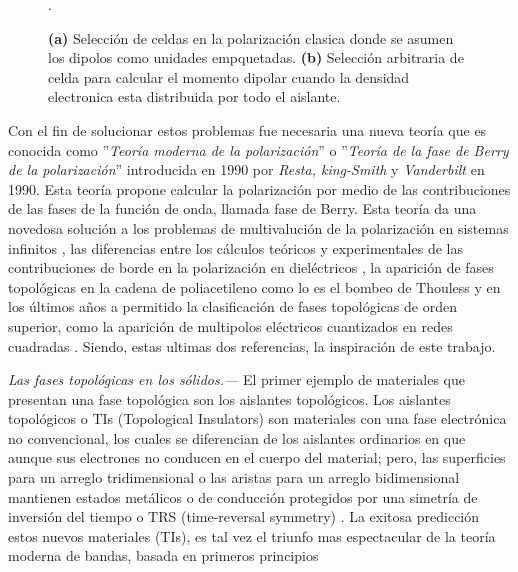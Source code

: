 \begin{figure}[h!]
\begin{subfigure}[b!]{0.3 \textwidth}
    \end{subfigure}\hspace*{1em} \vspace*{0.5em}
       \caption{\textbf{(a)} Selección de celdas en la polarización clasica donde se asumen los dipolos como unidades empquetadas. \textbf{(b)} Selección arbitraria de celda para calcular el momento dipolar cuando la densidad electronica esta distribuida por todo el aislante.}.
       \label{fig:cell_selection}
\end{figure}

Con el fin de solucionar estos problemas fue necesaria una nueva teoría que es conocida como ''\textit{Teoría moderna de la polarización}'' o ''\textit{Teoría de la fase de Berry de la polarización}'' introducida en 1990 por \textit{Resta, king-Smith} y \textit{Vanderbilt} en 1990. Esta teoría propone calcular la polarización por medio de las contribuciones de las fases de la función de onda, llamada fase de Berry. Esta teoría da una novedosa solución a los problemas de multivalución de la polarización en sistemas infinitos \cite{spaldin2012beginner}, las diferencias entre los cálculos teóricos y experimentales de las contribuciones de borde en la polarización en dieléctricos \cite{rabe2007modern}, la aparición de fases topológicas en la cadena de poliacetileno como lo es el bombeo de Thouless  y en los últimos años a permitido la clasificación de fases topológicas de orden superior, como la aparición de multipolos eléctricos cuantizados en redes cuadradas \cite{Benalcazar2017}. Siendo, estas ultimas dos referencias, la inspiración de este trabajo.  


{\it Las fases topológicas en los sólidos.---} El primer ejemplo de materiales que presentan una fase topológica son los aislantes topológicos. Los aislantes topológicos o TIs (Topological Insulators) son materiales con una fase electrónica no convencional, los cuales se diferencian de los aislantes ordinarios en que aunque sus electrones no conducen en el cuerpo del material; pero, las superficies para un arreglo tridimensional o las aristas para un arreglo bidimensional mantienen estados metálicos o de conducción protegidos por una simetría de inversión del tiempo o TRS (time-reversal symmetry) \cite{Shore2018}. La exitosa predicción estos nuevos materiales (TIs), es tal vez el triunfo mas espectacular de la teoría moderna de bandas, basada en primeros principios  

